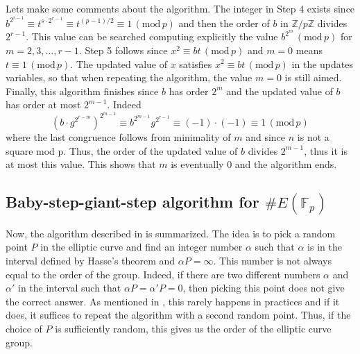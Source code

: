 \documentclass[letter,11pt,reqno]{article}
\theoremstyle{definition}
\theoremstyle{definition}
\theoremstyle{definition}
\theoremstyle{remark}
\theoremstyle{definition}
\theoremstyle{definition}
\newcommand{\Fp}{\mathbb{F}_p}
\newcommand{\modp}{\,(\text{mod}\, p)}
\begin{document}
\noindent Lets make some comments about the algorithm. The integer in Step 4 exists since $b^{2^{r-1}} \equiv t^{s\cdot2^{r-1}} \equiv t^{(p-1)/2} \equiv 1 \modp$ and then the order of $b$ in $\mathbb{Z}/p\mathbb{Z}$ divides $2^{r-1}$. This value can be searched computing explicitly the value $b^{2^m} \modp$ for $m=2,3,\ldots,r-1$. Step 5 follows since $x^2 \equiv bt \modp$ and $m=0$ means $t\equiv 1 \modp$. The updated value of $x$ satisfies $x^2 \equiv bt \modp$ in the updates variables, so that when repeating the algorithm, the value $m=0$ is still aimed. Finally, this algorithm finishes since $b$ has order $2^m$ and the updated value of $b$ has order at most $2^{m-1}$. Indeed $$(b\cdot g^{2^{r-m}})^{2^{m-1}} \equiv b^{2^{m-1}}g^{2^{r-1}} \equiv (-1)\cdot(-1) \equiv 1\modp$$ where the last congruence follows from minimality of $m$ and since $n$ is not a square mod p. Thus, the order of the updated value of $b$ divides $2^{m-1}$, thus it is at most this value. This shows that $m$ is eventually $0$ and the algorithm ends. 

\subsection{Baby-step-giant-step algorithm for $\# E(\Fp)$}
Now, the algorithm described in \cite{Schoof1995} is summarized. The idea is to pick a random point $P$ in the elliptic curve and find an integer number $\alpha$ such that $\alpha$ is in the interval defined by Hasse's theorem and $\alpha P = \infty$. This number is not always equal to the order of the group. Indeed, if there are two different numbers $\alpha$ and $\alpha'$ in the interval such that $\alpha P = \alpha' P = 0$, then picking this point does not give the correct answer. As mentioned in \cite{Schoof1995}, this rarely happens in practices and if it does, it suffices to repeat the algorithm with a second random point. Thus, if the choice of $P$ is sufficiently random, this gives us the order of the elliptic curve group. 
\newpage
\end{document}
